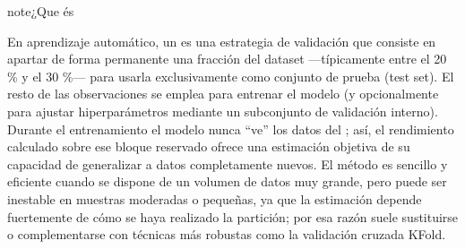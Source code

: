 \documentclass[a4paper,10pt,spanish]{jupyterBook}
\begin{document}
\begin{sphinxadmonition}{note}{¿Que és }

\sphinxAtStartPar
En aprendizaje automático, un  es una estrategia de validación que consiste en apartar de forma permanente una fracción del dataset —típicamente entre el 20 \% y el 30 \%— para usarla exclusivamente como conjunto de prueba (test set). El resto de las observaciones se emplea para entrenar el modelo (y opcionalmente para ajustar hiperparámetros mediante un subconjunto de validación interno). Durante el entrenamiento el modelo nunca “ve” los datos del ; así, el rendimiento calculado sobre ese bloque reservado ofrece una estimación objetiva de su capacidad de generalizar a datos completamente nuevos. El método es sencillo y eficiente cuando se dispone de un volumen de datos muy grande, pero puede ser inestable en muestras moderadas o pequeñas, ya que la estimación depende fuertemente de cómo se haya realizado la partición; por esa razón suele sustituirse o complementarse con técnicas más robustas como la validación cruzada K\sphinxhyphen{}Fold.
\end{sphinxadmonition}
\end{document}
